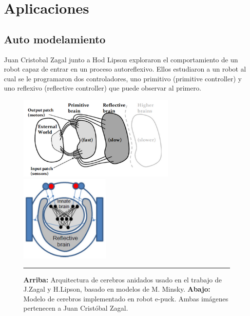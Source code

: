 
\chapter{Aplicaciones} %

\label{ChapterX} %



\section{Auto modelamiento}

Juan Cristobal Zagal junto a Hod Lipson \cite{ZagalL09} exploraron el comportamiento de un robot capaz de entrar en un proceso autoreflexivo. Ellos estudiaron a un robot al cual se le programaron dos controladores, uno primitivo (primitive controller) y uno reflexivo (reflective controller) que puede observar al primero.

\begin{figure}[htbp]
	\centering
		\includegraphics[width=0.7\textwidth]{./Figures/arquitectura_cerebro.png}
		\includegraphics[width=0.4\textwidth]{./Figures/automodelado_epuck.png}
		\rule{35em}{0.5pt}
	\caption[Automodelado]{\textbf{Arriba:} Arquitectura de cerebros anidados usado en el trabajo de J.Zagal y H.Lipson, basado en modelos de M. Minsky. \textbf{Abajo:} Modelo de cerebros implementado en robot e-puck. Ambas imágenes  pertenecen a Juan Cristóbal Zagal.}
	\label{fig:Automodelado}
\end{figure}

